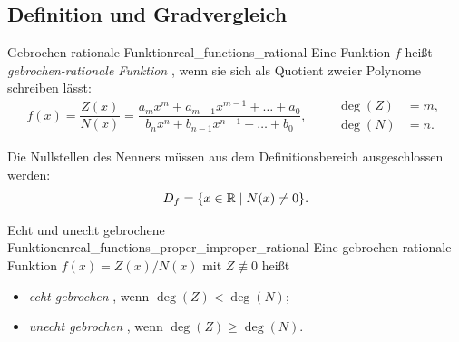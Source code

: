 \subsection{Definition und Gradvergleich}
\label{subsec:real_functions_rational_fundamentals}
\par\noindent\begin{minipage}{\linewidth}
\begin{DefinitionBox}{Gebrochen-rationale Funktion}{real_functions_rational}
  Eine Funktion $f$ heißt \emph{gebrochen-rationale Funktion}
  , wenn sie sich als Quotient zweier Polynome
  schreiben lässt:
  \[
    f(x)=\frac{Z(x)}{N(x)}
      =\frac{a_mx^m+a_{m-1}x^{m-1}+\dots+a_0}
            {b_nx^n+b_{n-1}x^{n-1}+\dots+b_0},
    \qquad
    \begin{aligned}
      \deg(Z)&=m,\\
      \deg(N)&=n.
    \end{aligned}
  \]

  \medskip
  Die Nullstellen des Nenners müssen aus dem Definitionsbereich ausgeschlossen werden:
  \[
    D_f=\{x\in\mathbb{R}\mid N(x)\ne0\}.
  \]
\end{DefinitionBox}

\begin{DefinitionBox}{Echt und unecht gebrochene Funktionen}{real_functions_proper_improper_rational}
  Eine gebrochen-rationale Funktion $f(x)=Z(x)/N(x)$ mit $Z\not\equiv0$ heißt
  \begin{itemize}
    \item \emph{echt gebrochen} , wenn $\deg(Z)<\deg(N)$;
    \item \emph{unecht gebrochen} , wenn $\deg(Z)\ge\deg(N)$.
  \end{itemize}
\end{DefinitionBox}


\end{minipage}
